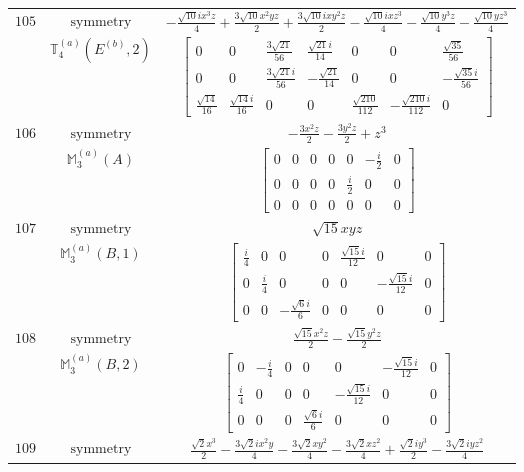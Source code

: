 \documentclass[fleqn,8pt,landscape]{jsarticle}
\begin{document}
\begin{longtable}{ccc}
$ 105 $ & $ \text{symmetry} $ & $ - \frac{\sqrt{10} i x^{3} z}{4} + \frac{3 \sqrt{10} x^{2} y z}{2} + \frac{3 \sqrt{10} i x y^{2} z}{2} - \frac{\sqrt{10} i x z^{3}}{4} - \frac{\sqrt{10} y^{3} z}{4} - \frac{\sqrt{10} y z^{3}}{4} $ \\
$  $ & $ \mathbb{T}_{4}^{(a)}(E^{(b)},2) $ & $ \begin{bmatrix} 0 & 0 & \frac{3 \sqrt{21}}{56} & \frac{\sqrt{21} i}{14} & 0 & 0 & \frac{\sqrt{35}}{56} \\ 0 & 0 & \frac{3 \sqrt{21} i}{56} & - \frac{\sqrt{21}}{14} & 0 & 0 & - \frac{\sqrt{35} i}{56} \\ \frac{\sqrt{14}}{16} & \frac{\sqrt{14} i}{16} & 0 & 0 & \frac{\sqrt{210}}{112} & - \frac{\sqrt{210} i}{112} & 0 \end{bmatrix} $ \\ \hline
$ 106 $ & $ \text{symmetry} $ & $ - \frac{3 x^{2} z}{2} - \frac{3 y^{2} z}{2} + z^{3} $ \\
$  $ & $ \mathbb{M}_{3}^{(a)}(A) $ & $ \begin{bmatrix} 0 & 0 & 0 & 0 & 0 & - \frac{i}{2} & 0 \\ 0 & 0 & 0 & 0 & \frac{i}{2} & 0 & 0 \\ 0 & 0 & 0 & 0 & 0 & 0 & 0 \end{bmatrix} $ \\ \hline
$ 107 $ & $ \text{symmetry} $ & $ \sqrt{15} x y z $ \\
$  $ & $ \mathbb{M}_{3}^{(a)}(B,1) $ & $ \begin{bmatrix} \frac{i}{4} & 0 & 0 & 0 & \frac{\sqrt{15} i}{12} & 0 & 0 \\ 0 & \frac{i}{4} & 0 & 0 & 0 & - \frac{\sqrt{15} i}{12} & 0 \\ 0 & 0 & - \frac{\sqrt{6} i}{6} & 0 & 0 & 0 & 0 \end{bmatrix} $ \\ \hline
$ 108 $ & $ \text{symmetry} $ & $ \frac{\sqrt{15} x^{2} z}{2} - \frac{\sqrt{15} y^{2} z}{2} $ \\
$  $ & $ \mathbb{M}_{3}^{(a)}(B,2) $ & $ \begin{bmatrix} 0 & - \frac{i}{4} & 0 & 0 & 0 & - \frac{\sqrt{15} i}{12} & 0 \\ \frac{i}{4} & 0 & 0 & 0 & - \frac{\sqrt{15} i}{12} & 0 & 0 \\ 0 & 0 & 0 & \frac{\sqrt{6} i}{6} & 0 & 0 & 0 \end{bmatrix} $ \\ \hline
$ 109 $ & $ \text{symmetry} $ & $ \frac{\sqrt{2} x^{3}}{2} - \frac{3 \sqrt{2} i x^{2} y}{4} - \frac{3 \sqrt{2} x y^{2}}{4} - \frac{3 \sqrt{2} x z^{2}}{4} + \frac{\sqrt{2} i y^{3}}{2} - \frac{3 \sqrt{2} i y z^{2}}{4} $ \\

\end{longtable}
\end{document}
